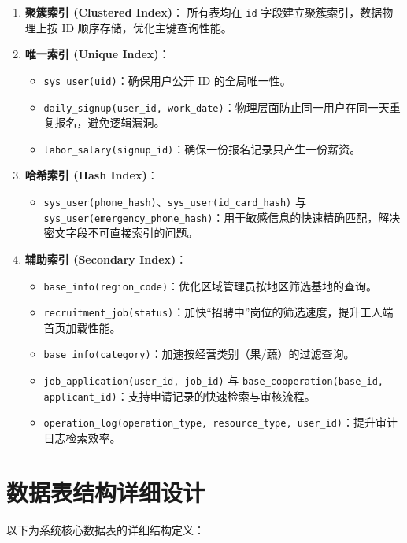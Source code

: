 \documentclass[UTF8,a4paper,12pt]{article}
\begin{document}
\begin{enumerate}
    \item \textbf{聚簇索引 (Clustered Index)}：
    所有表均在 \texttt{id} 字段建立聚簇索引，数据物理上按 ID 顺序存储，优化主键查询性能。

    \item \textbf{唯一索引 (Unique Index)}：
    \begin{itemize}
        \item \texttt{sys\_user(uid)}：确保用户公开 ID 的全局唯一性。
        \item \texttt{daily\_signup(user\_id, work\_date)}：物理层面防止同一用户在同一天重复报名，避免逻辑漏洞。
        \item \texttt{labor\_salary(signup\_id)}：确保一份报名记录只产生一份薪资。
    \end{itemize}

    \item \textbf{哈希索引 (Hash Index)}：
    \begin{itemize}
        \item \texttt{sys\_user(phone\_hash)}、\texttt{sys\_user(id\_card\_hash)} 与 \texttt{sys\_user(emergency\_phone\_hash)}：用于敏感信息的快速精确匹配，解决密文字段不可直接索引的问题。
    \end{itemize}

    \item \textbf{辅助索引 (Secondary Index)}：
    \begin{itemize}
        \item \texttt{base\_info(region\_code)}：优化区域管理员按地区筛选基地的查询。
        \item \texttt{recruitment\_job(status)}：加快“招聘中”岗位的筛选速度，提升工人端首页加载性能。
        \item \texttt{base\_info(category)}：加速按经营类别（果/蔬）的过滤查询。
        \item \texttt{job\_application(user\_id, job\_id)} 与 \texttt{base\_cooperation(base\_id, applicant\_id)}：支持申请记录的快速检索与审核流程。
        \item \texttt{operation\_log(operation\_type, resource\_type, user\_id)}：提升审计日志检索效率。
    \end{itemize}
    
\end{enumerate}

\section{数据表结构详细设计}
以下为系统核心数据表的详细结构定义：
\end{document}
